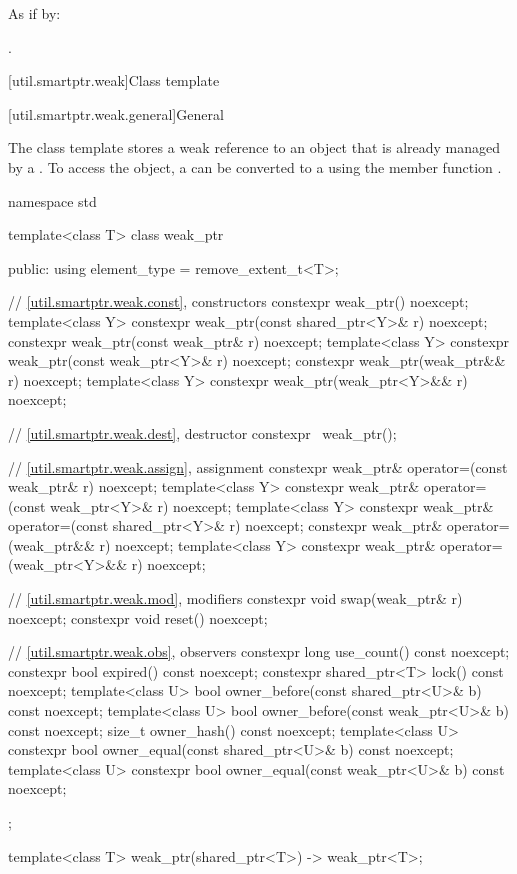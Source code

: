 \begin{itemdescr}
\pnum
\effects
As if by: 

\pnum
\returns
{}.
\end{itemdescr}

[util.smartptr.weak]{Class template }

[util.smartptr.weak.general]{General}

\pnum
{}%
The  class template stores a weak reference to an object
that is already managed by a . To access the object, a
 can be converted to a  using the member
function .

\begin{codeblock}
namespace std {
  template<class T> class weak_ptr {
  public:
    using element_type = remove_extent_t<T>;

    // \ref{util.smartptr.weak.const}, constructors
    constexpr weak_ptr() noexcept;
    template<class Y>
      constexpr weak_ptr(const shared_ptr<Y>& r) noexcept;
    constexpr weak_ptr(const weak_ptr& r) noexcept;
    template<class Y>
      constexpr weak_ptr(const weak_ptr<Y>& r) noexcept;
    constexpr weak_ptr(weak_ptr&& r) noexcept;
    template<class Y>
      constexpr weak_ptr(weak_ptr<Y>&& r) noexcept;

    // \ref{util.smartptr.weak.dest}, destructor
    constexpr ~weak_ptr();

    // \ref{util.smartptr.weak.assign}, assignment
    constexpr weak_ptr& operator=(const weak_ptr& r) noexcept;
    template<class Y>
      constexpr weak_ptr& operator=(const weak_ptr<Y>& r) noexcept;
    template<class Y>
      constexpr weak_ptr& operator=(const shared_ptr<Y>& r) noexcept;
    constexpr weak_ptr& operator=(weak_ptr&& r) noexcept;
    template<class Y>
      constexpr weak_ptr& operator=(weak_ptr<Y>&& r) noexcept;

    // \ref{util.smartptr.weak.mod}, modifiers
    constexpr void swap(weak_ptr& r) noexcept;
    constexpr void reset() noexcept;

    // \ref{util.smartptr.weak.obs}, observers
    constexpr long use_count() const noexcept;
    constexpr bool expired() const noexcept;
    constexpr shared_ptr<T> lock() const noexcept;
    template<class U>
      bool owner_before(const shared_ptr<U>& b) const noexcept;
    template<class U>
      bool owner_before(const weak_ptr<U>& b) const noexcept;
    size_t owner_hash() const noexcept;
    template<class U>
      constexpr bool owner_equal(const shared_ptr<U>& b) const noexcept;
    template<class U>
      constexpr bool owner_equal(const weak_ptr<U>& b) const noexcept;
  };

  template<class T>
    weak_ptr(shared_ptr<T>) -> weak_ptr<T>;
}
\end{codeblock}

